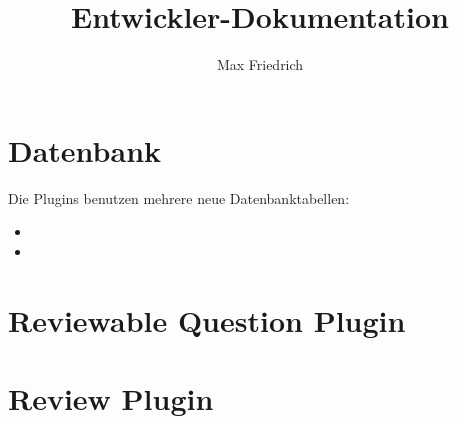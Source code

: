 \documentclass[12pt,a4paper]{scrreprt}
\author{Max Friedrich}
\title{Entwickler-Dokumentation}
\begin{document}
\tableofcontents

\chapter{Datenbank}
Die Plugins benutzen mehrere neue Datenbanktabellen:

\begin{itemize}
\item 
\item
\end{itemize}

\chapter{Reviewable Question Plugin}

\chapter{Review Plugin}
\end{document}
